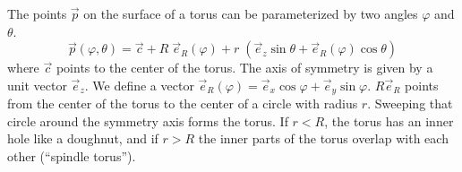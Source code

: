 \documentclass[linenumbers]{aastex631}
\begin{document}
The points $\vec p$ on the surface of a torus can be parameterized by two angles $\varphi$ and $\theta$.
\begin{equation}
\vec p(\varphi, \theta) = \vec c + R \; \vec e_R(\varphi) + r \; (\vec e_z \sin \theta + \vec e_R(\varphi) \cos \theta)
\end{equation}
where $\vec c$ points to the center of the torus. The axis of symmetry is given by a unit vector $\vec e_z$. We define a vector $\vec e_R(\varphi) = \vec e_x \cos\varphi + \vec e_y \sin\varphi$. $R \vec e_R$ points from the center of the torus to the center of a circle with radius $r$. Sweeping that circle around the symmetry axis forms the torus. If $r < R$, the torus has an inner hole like a doughnut, and if $r > R$ the inner parts of the torus overlap with each other (``spindle torus'').
\end{document}
